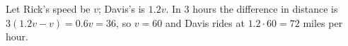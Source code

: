 Let Rick's speed be $v$; Davis's is $1.2v$. In $3$ hours the difference in distance is $3(1.2v-v)=0.6v=36$, so $v=60$ and Davis rides at $1.2\cdot60=\boxed{72}$ miles per hour.
